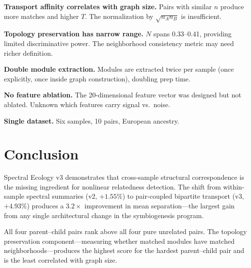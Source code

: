 \documentclass{../yalumba}
\begin{document}
\begin{limitation}
\textbf{Transport affinity correlates with graph size.}  Pairs with similar
$n$ produce more matches and higher $T$.  The normalization by $\sqrt{n_A n_B}$
is insufficient.
\end{limitation}

\begin{limitation}
\textbf{Topology preservation has narrow range.}  $N$ spans 0.33--0.41,
providing limited discriminative power.  The neighborhood consistency metric
may need richer definition.
\end{limitation}

\begin{limitation}
\textbf{Double module extraction.}  Modules are extracted twice per sample
(once explicitly, once inside graph construction), doubling prep time.
\end{limitation}

\begin{limitation}
\textbf{No feature ablation.}  The 20-dimensional feature vector was designed
but not ablated.  Unknown which features carry signal vs.\ noise.
\end{limitation}

\begin{limitation}
\textbf{Single dataset.}  Six samples, 10 pairs, European ancestry.
\end{limitation}


\section{Conclusion}
\label{sec:conclusion}

Spectral Ecology v3 demonstrates that cross-sample structural correspondence
is the missing ingredient for nonlinear relatedness detection.  The shift
from within-sample spectral summaries (v2, $+1.55\%$) to pair-coupled
bipartite transport (v3, $+4.93\%$) produces a $3.2\times$ improvement in
mean separation---the largest gain from any single architectural change in the
symbiogenesis program.


All four parent--child pairs rank above all four pure unrelated pairs.
The topology preservation component---measuring whether matched modules have
matched neighborhoods---produces the highest score for the hardest parent--child
pair and is the least correlated with graph size.
\end{document}
